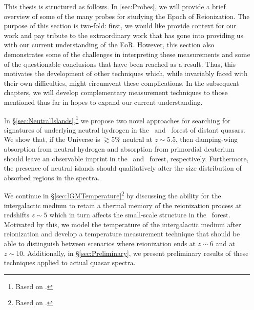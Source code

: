 %
%


This thesis is structured as follows. In \ref{sec:Probes}, we will provide a brief overview of some of the many probes for studying the Epoch of Reionization. The purpose of this section is two-fold: first, we would like provide context for our work and pay tribute to the extraordinary work that has gone into providing us with our current understanding of the EoR. However, this section also demonstrates some of the challenges in interpreting these measurements and some of the questionable conclusions that have been reached as a result. Thus, this motivates the development of other techniques which, while invariably faced with their own difficulties, might circumvent these complications. In the subsequent chapters, we will develop complementary measurement techniques to those mentioned thus far in hopes to expand our current understanding. 


In \S \ref{sec:NeutralIslands},\footnote{Based on \citet{malloy2015search}.} we propose two novel approaches for searching for signatures of underlying neutral hydrogen in the \lya\ and \lyb\ forest of distant quasars. We show that, if the Universe is $\gtrsim 5\%$ neutral at $z \sim 5.5$, then damping-wing absorption from neutral hydrogen and absorption from primordial deuterium should leave an observable imprint in the \lya\ and \lyb\ forest, respectively. Furthermore, the presence of neutral islands should qualitatively alter the size distribution of absorbed regions in the spectra.


We continue in \S \ref{sec:IGMTemperature}\footnote{Based on \citet{Lidz:2014jxa}.} by discussing the ability for the intergalactic medium to retain a thermal memory of the reionization process at redshifts $z \sim 5$ which in turn affects the small-scale structure in the \lya\ forest. Motivated by this, we model the temperature of the intergalactic medium after reionization and develop a temperature measurement technique that should be able to distinguish between  scenarios where reionization ends at $z \sim 6$ and at $z \sim 10$. Additionally, in \S \ref{sec:Preliminary}, we present preliminary results of these techniques applied to actual quasar spectra.


